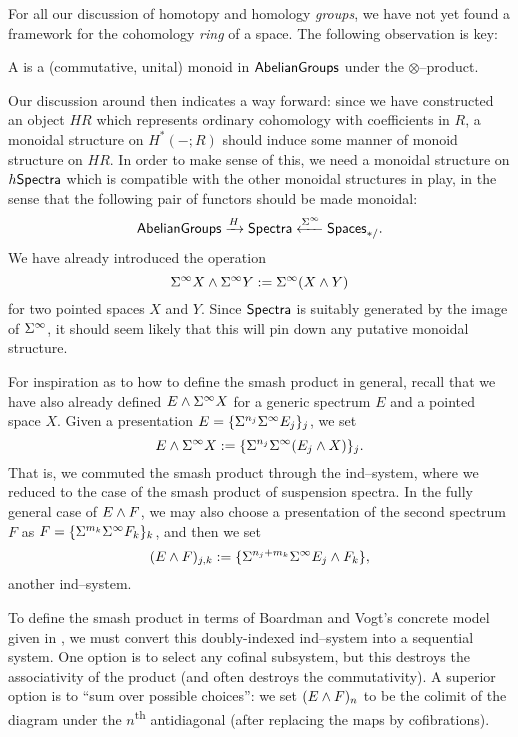 For all our discussion of homotopy and homology \emph{groups}, we have not yet found a framework for the cohomology \emph{ring} of a space.
The following observation is key:

\begin{definition}
A  is a (commutative, unital) monoid in $\mathsf{AbelianGroups}$ under the $\otimes$--product.%
\end{definition}

Our discussion around  then indicates a way forward: since we have constructed an object $HR$ which represents ordinary cohomology with coefficients in $R$, a monoidal structure on $H^*(-; R)$ should induce some manner of monoid structure on $HR$.%
In order to make sense of this, we need a monoidal structure on $h\mathsf{Spectra}$ which is compatible with the other monoidal structures in play, in the sense that the following pair of functors should be made monoidal: \[\mathsf{AbelianGroups} \xrightarrow H \mathsf{Spectra} \xleftarrow{\Sigma^\infty} \mathsf{Spaces}_{*/}.\]
We have already introduced the operation \[\Sigma^\infty X \wedge \Sigma^\infty Y := \Sigma^\infty(X \wedge Y)\] for two pointed spaces $X$ and $Y$.
Since $\mathsf{Spectra}$ is suitably generated by the image of $\Sigma^\infty$, it should seem likely that this will pin down any putative monoidal structure.

For inspiration as to how to define the smash product in general, recall that we have also already defined $E \wedge \Sigma^\infty X$ for a generic spectrum $E$ and a pointed space $X$.
Given a presentation $E = \{\Sigma^{n_j} \Sigma^\infty E_j\}_j$, we set \[E \wedge \Sigma^\infty X := \{\Sigma^{n_j} \Sigma^\infty (E_j \wedge X)\}_j.\]
That is, we commuted the smash product through the ind--system, where we reduced to the case of the smash product of suspension spectra.
In the fully general case of $E \wedge F$, we may also choose a presentation of the second spectrum $F$ as $F = \{\Sigma^{m_k} \Sigma^\infty F_k\}_k$, and then we set \[(E \wedge F)_{j,k} := \{\Sigma^{n_j + m_k} \Sigma^\infty E_j \wedge F_k\},\] another ind--system.

\begin{remark}
To define the smash product in terms of Boardman and Vogt's concrete model given in , we must convert this doubly-indexed ind--system into a sequential system.
One option is to select any cofinal subsystem, but this destroys the associativity of the product (and often destroys the commutativity).
A superior option is to ``sum over possible choices'': we set $(E \wedge F)_n$ to be the colimit of the diagram under the $n$\textsuperscript{th} antidiagonal (after replacing the maps by cofibrations).
\end{remark}

